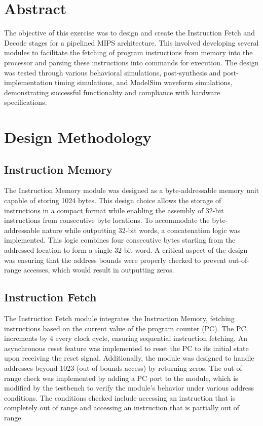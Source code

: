 \documentclass[CMPE]{../KGCOEReport}
\begin{document}
\maketitle

\section*{Abstract}

The objective of this exercise was to design and create the Instruction Fetch and Decode stages for a pipelined MIPS architecture. This involved developing several modules to facilitate the fetching of program instructions from memory into the processor and parsing these instructions into commands for execution. The design was tested through various behavioral simulations, post-synthesis and post-implementation timing simulations, and ModelSim waveform simulations, demonstrating successful functionality and compliance with hardware specifications.

\section*{Design Methodology}

\subsection*{Instruction Memory}
The Instruction Memory module was designed as a byte-addressable memory unit capable of storing 1024 bytes. This design choice allows the storage of instructions in a compact format while enabling the assembly of 32-bit instructions from consecutive byte locations. To accommodate the byte-addressable nature while outputting 32-bit words, a concatenation logic was implemented. This logic combines four consecutive bytes starting from the addressed location to form a single 32-bit word. A critical aspect of the design was ensuring that the address bounds were properly checked to prevent out-of-range accesses, which would result in outputting zeros.

\subsection*{Instruction Fetch}
The Instruction Fetch module integrates the Instruction Memory, fetching instructions based on the current value of the program counter (PC). The PC increments by 4 every clock cycle, ensuring sequential instruction fetching. An asynchronous reset feature was implemented to reset the PC to its initial state upon receiving the reset signal. Additionally, the module was designed to handle addresses beyond 1023 (out-of-bounds access) by returning zeros. The out-of-range check was implemented by adding a PC port to the module, which is modified by the testbench to verify the module's behavior under various address conditions. The conditions checked include accessing an instruction that is completely out of range and accessing an instruction that is partially out of range.
\end{document}
